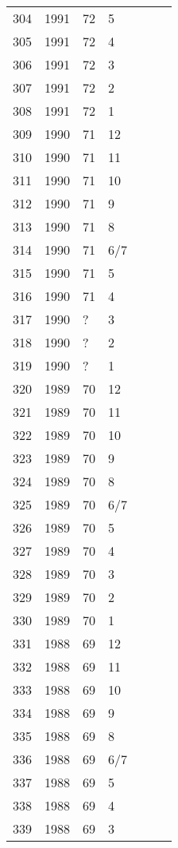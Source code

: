 \begin{longtable}{ |l|l|l|l|l|l|l| }
304 & 1991 & 72 & 5 &  &  &  \\
305 & 1991 & 72 & 4 &  &  &  \\
306 & 1991 & 72 & 3 &  &  &  \\
307 & 1991 & 72 & 2 &  &  &  \\
308 & 1991 & 72 & 1 &  &  &  \\
309 & 1990 & 71 & 12 &  &  &  \\
310 & 1990 & 71 & 11 &  &  &  \\
311 & 1990 & 71 & 10 &  &  &  \\
312 & 1990 & 71 & 9 &  &  &  \\
313 & 1990 & 71 & 8 &  &  &  \\
314 & 1990 & 71 & 6/7 &  &  &  \\
315 & 1990 & 71 & 5 &  &  &  \\
316 & 1990 & 71 & 4 &  &  &  \\
317 & 1990 & ? & 3 &  &  &  \\
318 & 1990 & ? & 2 &  &  &  \\
319 & 1990 & ? & 1 &  &  &  \\
320 & 1989 & 70 & 12 &  &  &  \\
321 & 1989 & 70 & 11 &  &  &  \\
322 & 1989 & 70 & 10 &  &  &  \\
323 & 1989 & 70 & 9 &  &  &  \\
324 & 1989 & 70 & 8 &  &  &  \\
325 & 1989 & 70 & 6/7 &  &  &  \\
326 & 1989 & 70 & 5 &  &  &  \\
327 & 1989 & 70 & 4 &  &  &  \\
328 & 1989 & 70 & 3 &  &  &  \\
329 & 1989 & 70 & 2 &  &  &  \\
330 & 1989 & 70 & 1 &  &  &  \\
331 & 1988 & 69 & 12 &  &  &  \\
332 & 1988 & 69 & 11 &  &  &  \\
333 & 1988 & 69 & 10 &  &  &  \\
334 & 1988 & 69 & 9 &  &  &  \\
335 & 1988 & 69 & 8 &  &  &  \\
336 & 1988 & 69 & 6/7 &  &  &  \\
337 & 1988 & 69 & 5 &  &  &  \\
338 & 1988 & 69 & 4 &  &  &  \\
339 & 1988 & 69 & 3 &  &  &  \\

\end{longtable}
